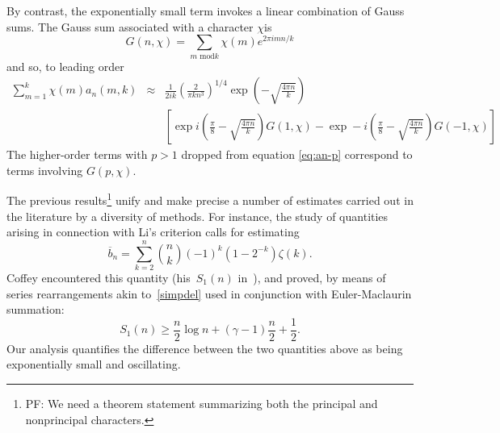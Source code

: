 \documentclass{amsart}
\begin{document}
By contrast, the exponentially small term invokes a linear combination
of Gauss sums. The Gauss sum associated with a character $\chi$is
\begin{equation}
G(n,\chi)=\sum_{m\mbox{ mod}k}\chi(m)e^{2\pi imn/k}\label{eq:}\end{equation}
 and so, to leading order \begin{eqnarray}
\sum_{m=1}^{k}\chi(m)a_{n}(m,k) & \approx & \frac{1}{2ik}\left(\frac{2}{\pi kn^{3}}\right)^{1/4}\exp\left(-\sqrt{\frac{4\pi n}{k}}\right)\nonumber \\
 &  & \left[\exp i\left(\frac{\pi}{8}-\sqrt{\frac{4\pi n}{k}}\right)G(1,\chi)-\exp-i\left(\frac{\pi}{8}-\sqrt{\frac{4\pi n}{k}}\right)G(-1,\chi)\right]\label{eq:}\end{eqnarray}
 The higher-order terms with $p>1$ dropped from equation \ref{eq:an-p}
correspond to terms involving $G(p,\chi)$. 


\begin{comment}
TODO -- The Hurwitz zeta can be avoided entirely by working directly
with the functional equation for the L-functions, as given by Apostol,
Chapter 12, Theorem 12.11. The direct form seems to imply some sort
of result/constraint on the $p\ne1$ terms in the expansion. It also
suggests that most of the deriviation above could be made clearer
by assuming a generic functional equation, and stating results in
terms of that. (e.g. assume Selberg-class type functional equation). 
\end{comment}

\smallskip
The previous results\footnote{%
	PF: We need a theorem statement summarizing both the principal and nonprincipal
	characters.}
unify and make precise a number of estimates carried out in the literature by a diversity
of methods. For instance, the study of quantities arising in connection with Li's criterion
calls for estimating
\begin{equation}\label{coffeyS1}
\overline{b}_n=\sum_{k=2}^n \binom{n}{k}(-1)^k(1-2^{-k})\zeta(k).
\end{equation}
Coffey encountered this quantity (his~$S_1(n)$ in~\cite{Coffey05}),
and proved, by means of series rearrangements akin to~\eqref{simpdel}
used in conjunction with Euler-Maclaurin summation:
\begin{equation}\label{coffeyineq}
S_1(n)\ge \frac{n}{2}\log n+(\gamma-1)\frac{n}{2}+\frac12.
\end{equation}
Our analysis quantifies  the difference between the two quantities above as
being exponentially small and oscillating.
\end{document}
